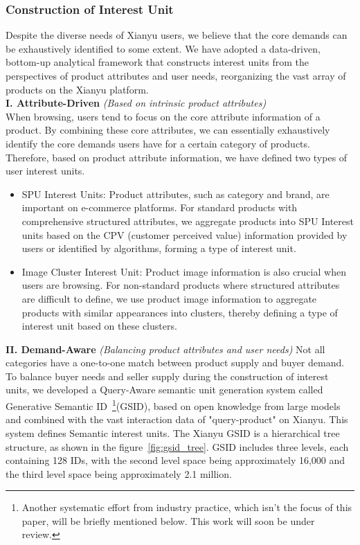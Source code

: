 \subsubsection{\textbf{Construction of Interest Unit}} Despite the diverse needs of Xianyu users, we believe that the core demands can be exhaustively identified to some extent. We have adopted a data-driven, bottom-up analytical framework that constructs interest units from the perspectives of product attributes and user needs, reorganizing the vast array of products on the Xianyu platform. 
\\ \textbf{I. Attribute-Driven} \textit{(Based on intrinsic product attributes)} \\
When browsing, users tend to focus on the core attribute information of a product. By combining these core attributes, we can essentially exhaustively identify the core demands users have for a certain category of products. Therefore, based on product attribute information, we have defined two types of user interest units.
\begin{itemize}
    \item SPU Interest Units: Product attributes, such as category and brand, are important on e-commerce platforms. For standard products with comprehensive structured attributes, we aggregate products into SPU Interest units based on the CPV (customer perceived value) information provided by users or identified by algorithms, forming a type of interest unit.
    \item Image Cluster Interest Unit: Product image information is also crucial when users are browsing. For non-standard products where structured attributes are difficult to define, we use product image information to aggregate products with similar appearances into clusters, thereby defining a type of interest unit based on these clusters.
\end{itemize}
\textbf{II. Demand-Aware} \textit{(Balancing product attributes and user needs)}
Not all categories have a one-to-one match between product supply and buyer demand. To balance buyer needs and seller supply during the construction of interest units, we developed a Query-Aware semantic unit generation system called Generative Semantic ID~\footnote{Another systematic effort from industry practice, which isn't the focus of this paper, will be briefly mentioned below. This work will soon be under review.}(GSID), based on open knowledge from large models and combined with the vast interaction data of "query-product" on Xianyu. This system defines Semantic interest units. The Xianyu GSID is a hierarchical tree structure, as shown in the figure~\ref{fig:gsid_tree}. GSID includes three levels, each containing 128 IDs, with the second level space being approximately 16,000 and the third level space being approximately 2.1 million.
